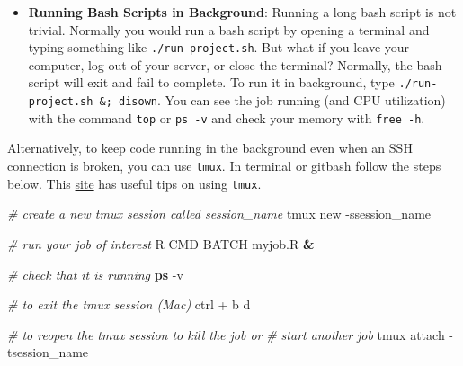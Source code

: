 \documentclass[
]{book}
\newenvironment{Shaded}{\begin{snugshade}}{\end{snugshade}}
\newcommand{\AttributeTok}[1]{\textcolor[rgb]{0.13,0.29,0.53}{#1}}
\newcommand{\CommentTok}[1]{\textcolor[rgb]{0.56,0.35,0.01}{\textit{#1}}}
\newcommand{\ExtensionTok}[1]{#1}
\newcommand{\FunctionTok}[1]{\textcolor[rgb]{0.13,0.29,0.53}{\textbf{#1}}}
\newcommand{\KeywordTok}[1]{\textcolor[rgb]{0.13,0.29,0.53}{\textbf{#1}}}
\newcommand{\NormalTok}[1]{#1}
\providecommand{\tightlist}{%
  \setlength{\itemsep}{0pt}\setlength{\parskip}{0pt}}
\begin{document}
\begin{itemize}
\tightlist
\item
  \textbf{Running Bash Scripts in Background}: Running a long bash script is not trivial. Normally you would run a bash script by opening a terminal and typing something like \texttt{./run-project.sh}. But what if you leave your computer, log out of your server, or close the terminal? Normally, the bash script will exit and fail to complete. To run it in background, type \texttt{./run-project.sh\ \&;\ disown}. You can see the job running (and CPU utilization) with the command \texttt{top} or \texttt{ps\ -v} and check your memory with \texttt{free\ -h}.
\end{itemize}

Alternatively, to keep code running in the background even when an SSH connection is broken, you can use \texttt{tmux}. In terminal or gitbash follow the steps below. This \href{https://medium.com/@jeongwhanchoi/install-tmux-on-osx-and-basics-commands-for-beginners-be22520fd95e}{site} has useful tips on using \texttt{tmux}.

\begin{Shaded}
\begin{Highlighting}[]
\CommentTok{\# create a new tmux session called session\_name}
\ExtensionTok{tmux}\NormalTok{ new }\AttributeTok{{-}ssession\_name}

\CommentTok{\# run your job of interest}
\ExtensionTok{R}\NormalTok{ CMD BATCH myjob.R }\KeywordTok{\&} 
  
\CommentTok{\# check that it is running}
\FunctionTok{ps} \AttributeTok{{-}v}

\CommentTok{\# to exit the tmux session (Mac)}
\ExtensionTok{ctrl}\NormalTok{ + b }
\ExtensionTok{d}

\CommentTok{\# to reopen the tmux session to kill the job or }
\CommentTok{\# start another job}
\ExtensionTok{tmux}\NormalTok{ attach }\AttributeTok{{-}tsession\_name} 
\end{Highlighting}
\end{Shaded}
\end{document}
